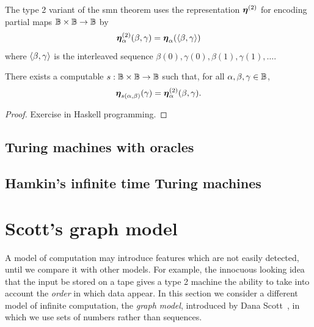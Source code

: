 The type 2 variant of the smn theorem uses the representation
$\text{\boldmath{$\eta$}}^{(2)}$ for encoding partial maps $\mathbb{B} \times \mathbb{B} \to
\mathbb{B}$ by
%
\begin{equation*}
  \text{\boldmath{$\eta$}}^{(2)}_{\alpha}(\beta, \gamma) = \text{\boldmath{$\eta$}}_{\alpha}(\langle \beta, \gamma \rangle)
\end{equation*}
%
where $\langle \beta, \gamma \rangle$ is the interleaved sequence $\beta(0), \gamma(0), \beta(1), \gamma(1), \ldots$.

\begin{theorem}
  There exists a computable $s : \mathbb{B} \times \mathbb{B} \to \mathbb{B}$ such
  that, for all $\alpha, \beta, \gamma \in \mathbb{B}$,
  \begin{equation*}
    \text{\boldmath{$\eta$}}_{s(\alpha, \beta)}(\gamma) = \text{\boldmath{$\eta$}}^{(2)}_{\alpha}(\beta, \gamma).
  \end{equation*}
\end{theorem}

\begin{proof}
  Exercise in Haskell programming.
\end{proof}

\subsection{Turing machines with oracles}
\label{sec:turing-machines-with}

\subsection{Hamkin's infinite time Turing machines}


\section{Scott's graph model}
\label{sec:graph-model}

A model of computation may introduce features which are not easily
detected, until we compare it with other models. For example, the
innocuous looking idea that the input be stored on a tape gives a type
2 machine the ability to take into account the \emph{order} in which
data appear. In this section we consider a different model of infinite
computation, the \emph{graph model}, introduced by Dana
Scott~, in which we use sets of numbers rather than
sequences.

